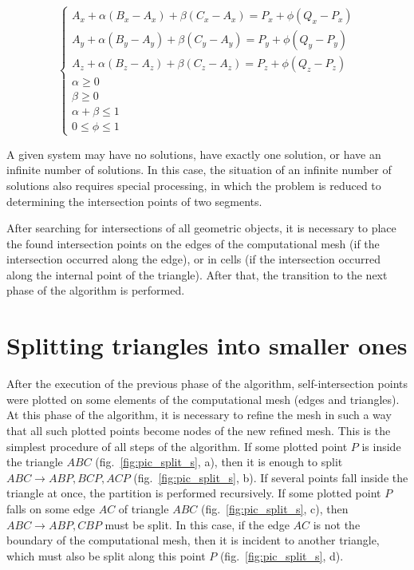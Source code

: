 \documentclass[
11pt,%
tightenlines,%
twoside,%
onecolumn,%
nofloats,%
nobibnotes,%
nofootinbib,%
superscriptaddress,%
noshowpacs,%
centertags]%
{revtex4}
\begin{document}
\begin{equation}
\begin{cases}
A_x + \alpha(B_x - A_x) + \beta(C_x - A_x) = P_x + \phi(Q_x - P_x) \\
A_y + \alpha(B_y - A_y) + \beta(C_y - A_y) = P_y + \phi(Q_y - P_y) \\
A_z + \alpha(B_z - A_z) + \beta(C_z - A_z) = P_z + \phi(Q_z - P_z) \\
\alpha \ge 0 \\
\beta \ge 0 \\
\alpha + \beta \le 1 \\
0 \le \phi \le 1
\end{cases}
\end{equation}

A given system may have no solutions, have exactly one solution, or have an infinite number of solutions.
In this case, the situation of an infinite number of solutions also requires special processing, in which the problem is reduced to determining the intersection points of two segments.

After searching for intersections of all geometric objects, it is necessary to place the found intersection points on the edges of the computational mesh (if the intersection occurred along the edge), or in cells (if the intersection occurred along the internal point of the triangle).
After that, the transition to the next phase of the algorithm is performed.

\section{Splitting triangles into smaller ones}

After the execution of the previous phase of the algorithm, self-intersection points were plotted on some elements of the computational mesh (edges and triangles).
At this phase of the algorithm, it is necessary to refine the mesh in such a way that all such plotted points become nodes of the new refined mesh.
This is the simplest procedure of all steps of the algorithm.
If some plotted point $P$ is inside the triangle $ABC$ (fig.~\ref{fig:pic_split_s}, a), then it is enough to split $ABC \rightarrow ABP, BCP, ACP$ (fig.~\ref{fig:pic_split_s}, b).
If several points fall inside the triangle at once, the partition is performed recursively.
If some plotted point $P$ falls on some edge $AC$ of triangle $ABC$ (fig.~\ref{fig:pic_split_s}, c), then $ABC \rightarrow ABP, CBP$ must be split.
In this case, if the edge $AC$ is not the boundary of the computational mesh, then it is incident to another triangle, which must also be split along this point $P$ (fig.~\ref{fig:pic_split_s}, d).
\end{document}
